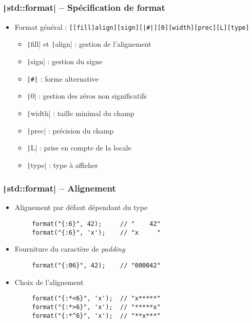 \documentclass[C++.tex]{subfiles}
\begin{document}
\begin{frame}[fragile]
	\frametitle{\texttt|std::format| -- Spécification de format}
	\begin{itemize}
		\item Format général : \texttt{[[fill]align][sign][|#|][0][width][prec][L][type]}
		\begin{itemize}
			\item \texttt|fill| et \texttt|align| : gestion de l'alignement
			\item \texttt|sign| : gestion du signe
			\item \texttt{|#|} : forme alternative
			\item \texttt|0| : gestion des zéros non significatifs
			\item \texttt|width| : taille minimal du champ
			\item \texttt|prec| : précision du champ
			\item \texttt|L| : prise en compte de la locale
			\item \texttt|type| : type à afficher
		\end{itemize}
	\end{itemize}
\end{frame}

\begin{frame}[fragile]
	\frametitle{\texttt|std::format| -- Alignement}
	\begin{itemize}
		\item Alignement par défaut dépendant du type
	\end{itemize}

	\begin{verbatim}
		format("{:6}", 42);     // "    42"
		format("{:6}", 'x');    // "x     "
	\end{verbatim}

	\begin{itemize}
		\item Fourniture du caractère de \textit{padding}
	\end{itemize}

	\begin{verbatim}
		format("{:06}", 42);    // "000042"
	\end{verbatim}

	\begin{itemize}
		\item Choix de l'alignement
	\end{itemize}

	\begin{verbatim}
		format("{:*<6}", 'x');  // "x*****"
		format("{:*>6}", 'x');  // "*****x"
		format("{:*^6}", 'x');  // "**x***"
	\end{verbatim}
\end{frame}
\end{document}
